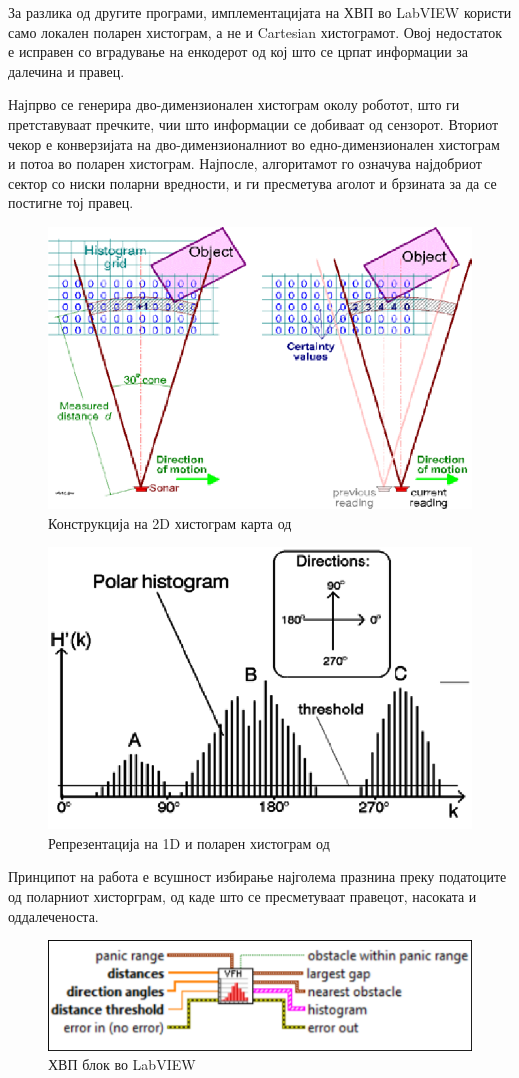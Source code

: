 \documentclass[11pt]{article}
\begin{document}
  За разлика од другите програми, имплементацијата на ХВП во LabVIEW користи само локален поларен хистограм, а не и Cartesian хистограмот. Овој недостаток е исправен со вградување на енкодерот од кој што се црпат информации за далечина и правец.

  Најпрво се генерира дво-димензионален хистограм околу роботот, што ги претставуваат пречките, чии што информации се добиваат од сензорот. Вториот чекор е конверзијата на дво-димензионалниот во едно-димензионален хистограм и потоа во поларен хистограм. Најпосле, алгоритамот го означува најдобриот сектор со ниски поларни вредности, и ги пресметува аголот и брзината за да се постигне тој правец.

  \begin{figure}[H]
    \centering
    \includegraphics[width=0.5\linewidth]{./images/2d_his.png}
    \caption{Конструкција на 2D хистограм карта од \cite{vfh_images}}
    \label{fig:2d_his.png}
    \end{figure}

  \begin{figure}[H]
    \centering
    \includegraphics[width=0.5\linewidth]{./images/1d_his.png}
    \caption{Репрезентација на 1D и поларен хистограм од \cite{vfh_images}}
    \label{fig:1d_his.png}
    \end{figure}

  Принципот на работа е всушност избирање најголема празнина преку податоците од поларниот хисторграм, од каде што се пресметуваат правецот, насоката и оддалеченоста.

  \begin{figure}[H]
    \centering
    \includegraphics[width=0.5\linewidth]{./images/vfh_lv.png}
    \caption{ХВП блок во LabVIEW}
    \label{fig:vfh_lv.png}
    \end{figure}
\end{document}
